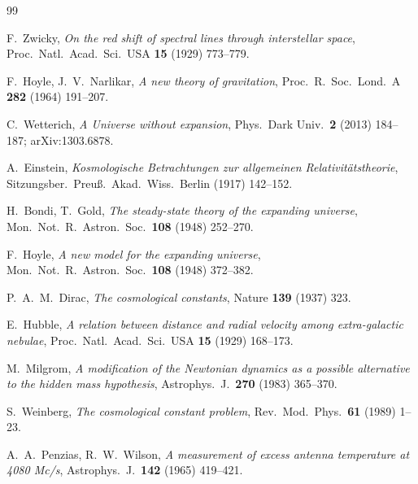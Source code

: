 \begin{thebibliography}{99}

F.~Zwicky, \textit{On the red shift of spectral lines through interstellar space},
Proc.\ Natl.\ Acad.\ Sci.\ USA \textbf{15} (1929) 773--779.

F.~Hoyle, J.~V.~Narlikar, \textit{A new theory of gravitation},
Proc.\ R.\ Soc.\ Lond.\ A \textbf{282} (1964) 191--207.

C.~Wetterich, \textit{A Universe without expansion},
Phys.\ Dark Univ.\ \textbf{2} (2013) 184--187; arXiv:1303.6878.

A.~Einstein, \textit{Kosmologische Betrachtungen zur allgemeinen Relativitätstheorie},
Sitzungsber.\ Preuß.\ Akad.\ Wiss.\ Berlin (1917) 142--152.

H.~Bondi, T.~Gold, \textit{The steady-state theory of the expanding universe},
Mon.\ Not.\ R.\ Astron.\ Soc.\ \textbf{108} (1948) 252--270.

F.~Hoyle, \textit{A new model for the expanding universe},
Mon.\ Not.\ R.\ Astron.\ Soc.\ \textbf{108} (1948) 372--382.

P.~A.~M.~Dirac, \textit{The cosmological constants}, Nature \textbf{139} (1937) 323.

E.~Hubble, \textit{A relation between distance and radial velocity among extra-galactic nebulae},
Proc.\ Natl.\ Acad.\ Sci.\ USA \textbf{15} (1929) 168--173.

M.~Milgrom, \textit{A modification of the Newtonian dynamics as a possible alternative to the
hidden mass hypothesis}, Astrophys.\ J.\ \textbf{270} (1983) 365--370.

S.~Weinberg, \textit{The cosmological constant problem}, Rev.\ Mod.\ Phys.\ \textbf{61} (1989) 1--23.

A.~A.~Penzias, R.~W.~Wilson, \textit{A measurement of excess antenna temperature at 4080 Mc/s},
Astrophys.\ J.\ \textbf{142} (1965) 419--421.

\end{thebibliography}
